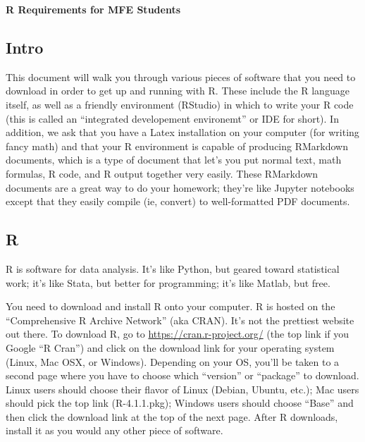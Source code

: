 \documentclass{article}\usepackage[]{graphicx}\usepackage[]{color}
\begin{document}

\begin{center}
\Large \bfseries R Requirements for MFE Students
\end{center}

\bigskip

\subsection*{Intro} %

This document will walk you through various pieces of software that you need to download in order to get up and running with R. These include the R language itself, as well as a friendly environment (RStudio) in which to write your R code (this is called an ``integrated developement environemt'' or IDE for short). In addition, we ask that you have a Latex installation on your computer (for writing fancy math) and that your R environment is capable of producing RMarkdown documents, which is a type of document that let's you put normal text, math formulas, R code, and R output together very easily. These RMarkdown documents are a great way to do your homework; they're like Jupyter notebooks except that they easily compile (ie, convert) to well-formatted PDF documents.

\subsection*{R} %

R is software for data analysis. It's like Python, but geared toward statistical work; it's like Stata, but better for programming; it's like Matlab, but free.
 
You need to download and install R onto your computer. R is hosted on the ``Comprehensive R Archive Network'' (aka CRAN). It's not the prettiest website out there. To download R, go to \url{https://cran.r-project.org/} (the top link if you Google ``R Cran'') and click on the download link for your operating system (Linux, Mac OSX, or Windows). Depending on your OS, you'll be taken to a second page where you have to choose which ``version'' or ``package'' to download. Linux users should choose their flavor of Linux (Debian, Ubuntu, etc.); Mac users should pick the top link (R-4.1.1.pkg); Windows users should choose ``Base'' and then click the download link at the top of the next page. After R downloads, install it as you would any other piece of software.
\end{document}
